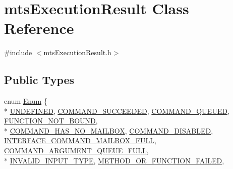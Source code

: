 \hypertarget{classmts_execution_result}{\section{mts\-Execution\-Result Class Reference}
\label{classmts_execution_result}
}


{\ttfamily \#include $<$mts\-Execution\-Result.\-h$>$}

\subsection*{Public Types}
\begin{DoxyCompactItemize}
\item 
enum \hyperlink{classmts_execution_result_a10c4246c82ac99d88e5f716f79407b77}{Enum} \{ \\*
\hyperlink{classmts_execution_result_a10c4246c82ac99d88e5f716f79407b77a183bab612ecf53030df4ff80a3b8af9b}{U\-N\-D\-E\-F\-I\-N\-E\-D}, 
\hyperlink{classmts_execution_result_a10c4246c82ac99d88e5f716f79407b77aced9d158769e7ef0f2f17ef840a5e44a}{C\-O\-M\-M\-A\-N\-D\-\_\-\-S\-U\-C\-C\-E\-E\-D\-E\-D}, 
\hyperlink{classmts_execution_result_a10c4246c82ac99d88e5f716f79407b77a0e4d6149853440cbcaaa65391fe3dc69}{C\-O\-M\-M\-A\-N\-D\-\_\-\-Q\-U\-E\-U\-E\-D}, 
\hyperlink{classmts_execution_result_a10c4246c82ac99d88e5f716f79407b77aae1438c8267646451b13a5568996d4c4}{F\-U\-N\-C\-T\-I\-O\-N\-\_\-\-N\-O\-T\-\_\-\-B\-O\-U\-N\-D}, 
\\*
\hyperlink{classmts_execution_result_a10c4246c82ac99d88e5f716f79407b77a79a24cdbfea1eda7d4cf9553596d50f7}{C\-O\-M\-M\-A\-N\-D\-\_\-\-H\-A\-S\-\_\-\-N\-O\-\_\-\-M\-A\-I\-L\-B\-O\-X}, 
\hyperlink{classmts_execution_result_a10c4246c82ac99d88e5f716f79407b77ae2ff22d330a4e0a41cd55be7dda1fc43}{C\-O\-M\-M\-A\-N\-D\-\_\-\-D\-I\-S\-A\-B\-L\-E\-D}, 
\hyperlink{classmts_execution_result_a10c4246c82ac99d88e5f716f79407b77af7073c80d884d8ecaf97df0413f5478e}{I\-N\-T\-E\-R\-F\-A\-C\-E\-\_\-\-C\-O\-M\-M\-A\-N\-D\-\_\-\-M\-A\-I\-L\-B\-O\-X\-\_\-\-F\-U\-L\-L}, 
\hyperlink{classmts_execution_result_a10c4246c82ac99d88e5f716f79407b77abe17446a118a2b26b3d80968f97b8f94}{C\-O\-M\-M\-A\-N\-D\-\_\-\-A\-R\-G\-U\-M\-E\-N\-T\-\_\-\-Q\-U\-E\-U\-E\-\_\-\-F\-U\-L\-L}, 
\\*
\hyperlink{classmts_execution_result_a10c4246c82ac99d88e5f716f79407b77ac6601646fdfa18f7069e95d8605291e0}{I\-N\-V\-A\-L\-I\-D\-\_\-\-I\-N\-P\-U\-T\-\_\-\-T\-Y\-P\-E}, 
\hyperlink{classmts_execution_result_a10c4246c82ac99d88e5f716f79407b77a720d247dc08ce1bc06edf1a021bcbb1e}{M\-E\-T\-H\-O\-D\-\_\-\-O\-R\-\_\-\-F\-U\-N\-C\-T\-I\-O\-N\-\_\-\-F\-A\-I\-L\-E\-D}, 

\end{DoxyCompactItemize}
